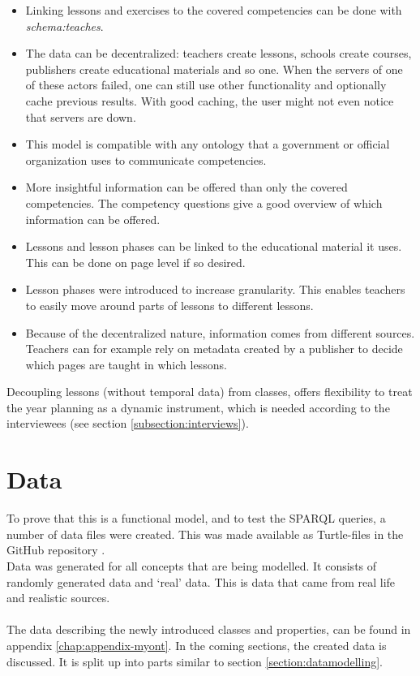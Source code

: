 \documentclass[a4paper]{report}
\begin{document}
    \begin{itemize}
        \item Linking lessons and exercises to the covered competencies can be done with \textit{schema:teaches}.
        \item The data can be decentralized: teachers create lessons, schools create courses, publishers create educational materials and so one. When the servers of one of these actors failed, one can still use other functionality and optionally cache previous results. With good caching, the user might not even notice that servers are down.
        \item This model is compatible with any ontology that a government or official organization uses to communicate competencies.
        \item More insightful information can be offered than only the covered competencies. The competency questions give a good overview of which information can be offered.
        \item Lessons and lesson phases can be linked to the educational material it uses. This can be done on page level if so desired.
        \item Lesson phases were introduced to increase granularity. This enables teachers to easily move around parts of lessons to different lessons.
        \item Because of the decentralized nature, information comes from different sources. Teachers can for example rely on metadata created by a publisher to decide which pages are taught in which lessons.
    \end{itemize}
    Decoupling lessons (without temporal data) from classes, offers flexibility to treat the year planning as a dynamic instrument, which is needed according to the interviewees (see section \ref{subsection:interviews}).


    \chapter{Data}
    \label{section:data}
    To prove that this is a functional model, and to test the SPARQL queries, a number of data files were created. This was made available as Turtle-files in the GitHub repository \cite{repo}.\\
    Data was generated for all concepts that are being modelled. It consists of randomly generated data and `real' data. This is data that came from real life and realistic sources.\\ \\
    The data describing the newly introduced classes and properties, can be found in appendix \ref{chap:appendix-myont}.
    In the coming sections, the created data is discussed. It is split up into parts similar to section \ref{section:datamodelling}.
\end{document}
